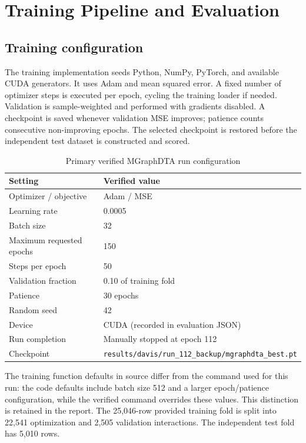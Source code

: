 ﻿\chapter{Training Pipeline and Evaluation}
\section{Training configuration}
The training implementation seeds Python, NumPy, PyTorch, and available CUDA generators. It uses Adam and mean squared error. A fixed number of optimizer steps is executed per epoch, cycling the training loader if needed. Validation is sample-weighted and performed with gradients disabled. A checkpoint is saved whenever validation MSE improves; patience counts consecutive non-improving epochs. The selected checkpoint is restored before the independent test dataset is constructed and scored.

\begin{table}[H]\centering\caption{Primary verified MGraphDTA run configuration}\label{tab:config}\begin{tabular}{ll}\toprule Setting & Verified value\\\midrule Optimizer / objective & Adam / MSE\\Learning rate & 0.0005\\Batch size & 32\\Maximum requested epochs & 150\\Steps per epoch & 50\\Validation fraction & 0.10 of training fold\\Patience & 30 epochs\\Random seed & 42\\Device & CUDA (recorded in evaluation JSON)\\Run completion & Manually stopped at epoch 112\\Checkpoint & \texttt{results/davis/run\_112\_backup/mgraphdta\_best.pt}\\\bottomrule\end{tabular}\end{table}

The training function defaults in source differ from the command used for this run: the code defaults include batch size 512 and a larger epoch/patience configuration, while the verified command overrides these values. This distinction is retained in the report. The 25,046-row provided training fold is split into 22,541 optimization and 2,505 validation interactions. The independent test fold has 5,010 rows.

